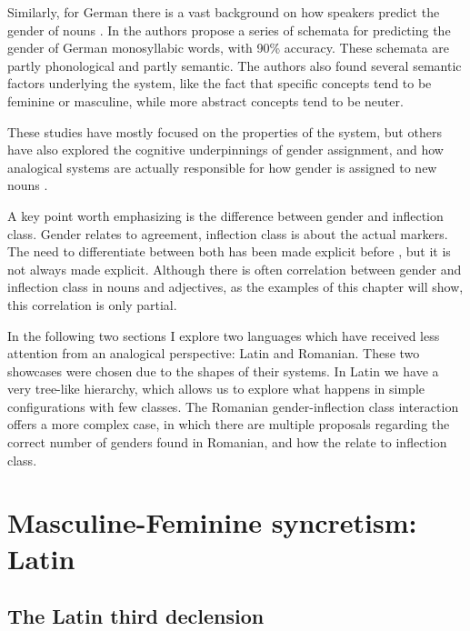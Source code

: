 Similarly, for German there is a vast background on how speakers predict the gender of nouns  \autocites{Hahn.2000, Kopcke.1984, Kopcke.2010, Zubin.1985, Salmons.1993, Schwichtenberg.2004, Zubin.1986, Zubin.1984}. In \textcite{Kopcke.1984} the authors propose a series of schemata for predicting the gender of German monosyllabic words, with 90\% accuracy. These schemata are partly phonological and partly semantic. The authors also found several semantic factors underlying the system, like the fact that specific concepts tend to be feminine or masculine, while more abstract concepts tend to be neuter.

These studies have mostly focused on the properties of the system, but others have also explored the cognitive underpinnings of gender assignment, and how analogical systems are actually responsible for how gender is assigned to new nouns \autocites{Holmes.2004, Caffarra.2015, Caffarra.2015a, Taylor.2012}.

A key point worth emphasizing is the difference between gender and inflection class. Gender relates to agreement, inflection class is about the actual markers. The need to differentiate between both has been made explicit before \autocite{Aronoff.1994, Harris.1991}, but it is not always made explicit. Although there is often correlation between gender and inflection class in nouns and adjectives, as the examples of this chapter will show, this correlation is only partial.

In the following two sections I explore two languages which have received less attention from an analogical perspective: Latin and Romanian. These two showcases were chosen due to the shapes of their systems. In Latin we have a very tree-like hierarchy, which allows us to explore what happens in simple configurations with few classes. The Romanian gender-inflection class interaction offers a more complex case, in which there are multiple proposals regarding the correct number of genders found in Romanian, and how the relate to inflection class.

\newpage
\section{Masculine-Feminine syncretism: Latin}

\subsection{The Latin third declension}

